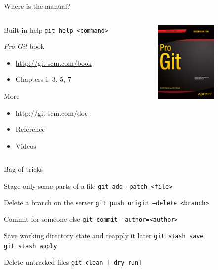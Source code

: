 \documentclass{beamer}
\begin{document}
\begin{frame}{Where is the manual?}
  \begin{columns}[t]
    \begin{column}{7cm}
      \begin{block}{Built-in help}
        \texttt{git help <command>}
      \end{block}
      \begin{block}{\emph{Pro Git} book}
        \begin{itemize}
        \item \url{http://git-scm.com/book}
        \item Chapters 1--3, 5, 7
        \end{itemize}
      \end{block}
      \begin{block}{More}
        \begin{itemize}
        \item \url{http://git-scm.com/doc}
        \item Reference
        \item Videos
        \end{itemize}
      \end{block}
    \end{column}
    \begin{column}{3cm}
      \begin{center}
        \includegraphics[width=3cm]{images/progit2.png}
      \end{center}
    \end{column}
  \end{columns}
\end{frame}

\begin{frame}{Bag of tricks}
  \begin{block}{Stage only some parts of a file}
    \texttt{git add --patch <file>}
  \end{block}
  \begin{block}{Delete a branch on the server}
    \texttt{git push origin --delete <branch>}
  \end{block}
  \begin{block}{Commit for someone else}
    \texttt{git commit --author=<author>}
  \end{block}
  \begin{block}{Save working directory state and reapply it later}
    \texttt{git stash save}\\\texttt{git stash apply}
  \end{block}
  \begin{block}{Delete untracked files}
    \texttt{git clean [--dry-run]}
  \end{block}
\end{frame}
\end{document}
